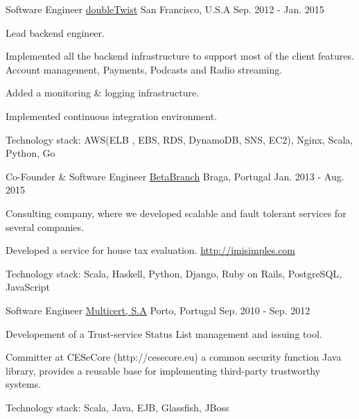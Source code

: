 \begin{cventries}
  \cventry
  {Software Engineer} %
  {\href{https://www.doubletwist.com}{doubleTwist}} %
  {San Francisco, U.S.A} %
  {Sep. 2012 - Jan. 2015} %
  {
    \begin{cvitems} %
      \item {Lead backend engineer.}
      \item {Implemented all the backend infrastructure to support most of the client features. Account management, Payments, Podcasts and Radio streaming.}
      \item {Added a monitoring \& logging infrastructure.}
      \item {Implemented continuous integration environment.}
      \item {Technology stack: AWS(ELB , EBS, RDS, DynamoDB, SNS, EC2), Nginx, Scala, Python, Go}
    \end{cvitems}
  }

  \cventry
  {Co-Founder \& Software Engineer} %
  {\href{http://betabranch.com}{BetaBranch}} %
  {Braga, Portugal} %
  {Jan. 2013 - Aug. 2015} %
  {
    \begin{cvitems} %
      \item {Consulting company, where we developed scalable and fault tolerant services for several companies.}
      \item {Developed a service for house tax evaluation. \url{http://imisimples.com}}
      \item {Technology stack: Scala, Haskell, Python, Django, Ruby on Rails, PostgreSQL, JavaScript}
    \end{cvitems}
  }

  \cventry
  {Software Engineer} %
  {\href{https://multicert.com}{Multicert, S.A}} %
  {Porto, Portugal} %
  {Sep. 2010 - Sep. 2012} %
  {
    \begin{cvitems} %
      \item {Developement of a Trust-service Status List management and issuing tool.}
      \item {Committer at CESeCore (http://cesecore.eu) a common security function Java library, provides a reusable base for implementing third-party trustworthy systems.}
      \item {Technology stack: Scala, Java, EJB, Glassfish, JBoss}
    \end{cvitems}
  }


\end{cventries}
